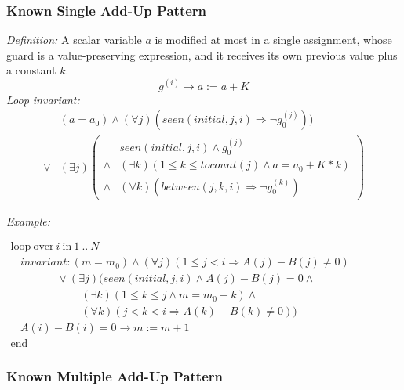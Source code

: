 \documentclass[a4paper,10pt]{article}
\newcommand{\idx}{\ensuremath{i}\xspace}
\newcommand{\idxinitial}{\ensuremath{\mathit{initial}}\xspace}
\newcommand{\at}[1]{{(#1)}}
\newcommand{\KWloop}{\ensuremath{\mathrm{loop}~}}
\newcommand{\KWend}{\ensuremath{\mathrm{end}~}}
\newcommand{\KWover}{\ensuremath{\mathrm{over}~}}
\newcommand{\KWin}{\ensuremath{~\mathrm{in}~}}
\newcommand{\impl}{\ensuremath{\Longrightarrow}}
\newcommand{\seen}[3]{\ensuremath{\mathit{seen}{(#1,#2,#3)}}\xspace}
\newcommand{\tocount}[1]{\ensuremath{\mathit{tocount}(#1)}\xspace}
\newcommand{\between}[3]{\ensuremath{\mathit{between}{(#1,#2,#3)}}\xspace}
\newcommand{\loopinvariant}{\noindent\textit{Loop invariant:}\xspace}
\newcommand{\patterndef}{\noindent\textit{Definition:}\xspace}
\newcommand{\patternexample}{\noindent\textit{Example:}\xspace}
\begin{document}
\subsubsection*{Known Single Add-Up Pattern}

\patterndef A scalar variable $a$ is modified at most in a single assignment, whose
guard is a value-preserving expression, and it receives its own previous value plus a constant $k$.
%
$$g^\at{\idx} \rightarrow a := a + K$$
%
\loopinvariant
%
\begin{eqnarray*}
&(a = a_0) \land (\forall j)(\seen{\idxinitial}{j}{\idx} \impl \neg g_0^\at{j})) \\
\lor 
& (\exists j)
\left(\begin{array}{cl}
&\seen{\idxinitial}{j}{\idx} \land g_0^\at{j}\\
 \land& (\exists k)(1 \leq k \leq \tocount{j} \land a = a_0 + K * k) \\
\land& (\forall k)(\between{j}{k}{\idx} \impl \neg g_0^\at{k})
\end{array}\right)
\end{eqnarray*}

\bigskip
\patternexample

\medskip
$\begin{array}{l}
  \KWloop \KWover i \KWin 1~..~N \\
  ~~~~ \textit{invariant}: (m = m_0) \land (\forall j)(1\leq j < i \impl A(j)-B(j)\neq0)\\
  ~~~~~~~~~~~~~~~~~~~ \lor (\exists j)(\seen{\idxinitial}{j}{\idx} \land A(j)-B(j)= 0 \land \\
  ~~~~~~~~~~~~~~~~~~~~~~~~~~~~~ (\exists k)(1 \leq k \leq j \land m = m_0 + k) \land\\
  ~~~~~~~~~~~~~~~~~~~~~~~~~~~~~ (\forall k)(j < k < i \impl A(k)-B(k)\neq0))\\
  ~~~~ A(i)-B(i)=0 \rightarrow m := m+1\\
  \KWend
\end{array}$

\subsubsection*{Known Multiple Add-Up Pattern}
\end{document}
